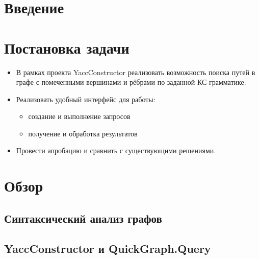 \documentclass[14pt]{matmex-diploma}
\begin{document}
\maketitle
\tableofcontents
\section*{Введение}

\section{Постановка задачи}
\begin{itemize}
    \item В рамках проекта YaccConstructor \cite{YaccConstructorPage} реализовать возможность поиска путей в графе с помеченными вершинами и рёбрами по заданной КС-грамматике.
    \item Реализовать удобный интерфейс для работы:
    \begin{itemize}
    \item создание и выполнение запросов 
    \item получение и обработка результатов
    \end{itemize}
    \item Провести апробацию и сравнить с существующими решениями.
    
\end{itemize}

\section{Обзор}

\subsection{Синтаксический анализ графов}

\subsection{YaccConstructor и QuickGraph.Query}
\end{document}
